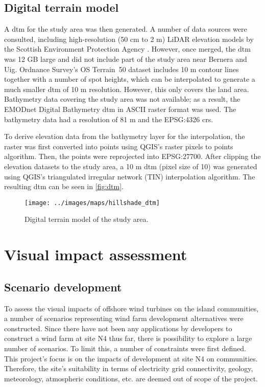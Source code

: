 \newpage
\subsection{Digital terrain model}

A \gls{dtm} for the study area was then generated. A number of data sources were consulted, including high-resolution (50 cm to 2 m) LiDAR elevation models by the Scottish Environment Protection Agency \autocite{sepa-lidar}. However, once merged, the \gls{dtm} was 12 GB large and did not include part of the study area near Bernera and Uig. Ordnance Survey's OS Terrain\textregistered\ 50 dataset includes 10 m contour lines together with a number of spot heights, which can be interpolated to generate a much smaller \gls{dtm} of 10 m resolution. However, this only covers the land area. Bathymetry data covering the study area was not available; as a result, the EMODnet Digital Bathymetry \gls{dtm} in ASCII raster format was used. The bathymetry data had a resolution of 81 m and the EPSG:4326 \gls{crs}.

To derive elevation data from the bathymetry layer for the interpolation, the raster was first converted into points using QGIS's raster pixels to points algorithm. Then, the points were reprojected into EPSG:27700. After clipping the elevation datasets to the study area, a 10 m \gls{dtm} (pixel size of 10) was generated using QGIS's triangulated irregular network (TIN) interpolation algorithm. The resulting \gls{dtm} can be seen in \autoref{fig:dtm}.

\begin{figure}
  \centering
  \texttt{[image: ../images/maps/hillshade\_dtm]}
  \caption{Digital terrain model of the study area. \label{fig:dtm}}
\end{figure}

\section{Visual impact assessment}

\subsection{Scenario development}

To assess the visual impacts of offshore wind turbines on the island communities, a number of scenarios representing wind farm development alternatives were constructed. Since there have not been any applications by developers to construct a wind farm at site N4 thus far, there is possibility to explore a large number of scenarios. To limit this, a number of constraints were first defined. This project's focus is on the impacts of development at site N4 on communities. Therefore, the site's suitability in terms of electricity grid connectivity, geology, meteorology, atmospheric conditions, etc. are deemed out of scope of the project.

